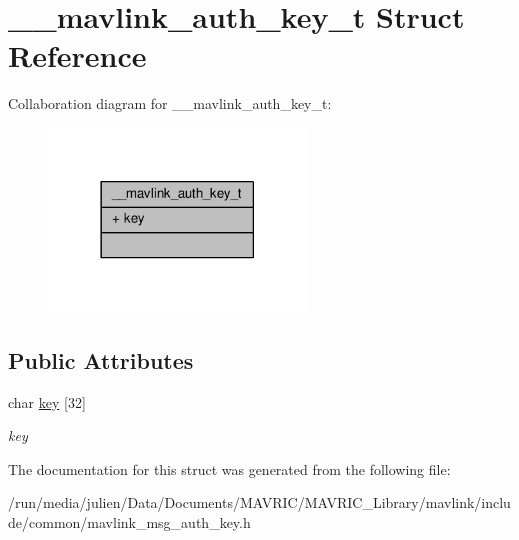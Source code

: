 \hypertarget{struct____mavlink__auth__key__t}{\section{\+\_\+\+\_\+mavlink\+\_\+auth\+\_\+key\+\_\+t Struct Reference}
\label{struct____mavlink__auth__key__t}
}


Collaboration diagram for \+\_\+\+\_\+mavlink\+\_\+auth\+\_\+key\+\_\+t\+:
\nopagebreak
\begin{figure}[H]
\begin{center}
\leavevmode
\includegraphics[width=194pt]{struct____mavlink__auth__key__t__coll__graph}
\end{center}
\end{figure}
\subsection*{Public Attributes}
\begin{DoxyCompactItemize}
\item 
\hypertarget{struct____mavlink__auth__key__t_a543d2ad5a931c4d983abb287a9da1f06}{char \hyperlink{struct____mavlink__auth__key__t_a543d2ad5a931c4d983abb287a9da1f06}{key} \mbox{[}32\mbox{]}}\label{struct____mavlink__auth__key__t_a543d2ad5a931c4d983abb287a9da1f06}

\begin{DoxyCompactList}\small\item\em key \end{DoxyCompactList}\end{DoxyCompactItemize}


The documentation for this struct was generated from the following file\+:\begin{DoxyCompactItemize}
\item 
/run/media/julien/\+Data/\+Documents/\+M\+A\+V\+R\+I\+C/\+M\+A\+V\+R\+I\+C\+\_\+\+Library/mavlink/include/common/mavlink\+\_\+msg\+\_\+auth\+\_\+key.\+h\end{DoxyCompactItemize}

